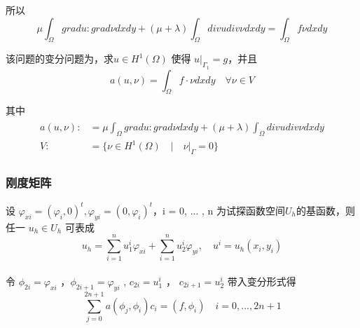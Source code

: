 \documentclass[a4paper,UTF8,titlepage]{ctexart}
\begin{document}
所以
$$
\mu \int_{\Omega} grad u : grad \nu dxdy + (\mu +\lambda) \int_{\Omega} div u div \nu  dxdy = \int_{\Omega} f \nu dxdy
$$

该问题的变分问题为，求$u \in H^1(\Omega)$ 使得 $u |_{\Gamma_1} = g$，并且
$$
	a(u,\nu) = \int_{\Omega} f \cdot \nu dxdy \quad \forall \nu \in V
$$ 
\par
其中
$$
	\begin{matrix}
		\begin{aligned}
			a(u,\nu) :&= \mu \int_{\Omega} grad u : grad \nu dxdy + (\mu +\lambda) \int_{\Omega} div u div \nu  dxdy \\  
			
			V :&= \{ \nu \in H^1(\Omega) \quad | \quad \nu |_{\Gamma} = 0 \}
		\end{aligned}
	\end{matrix}
$$



	
%
%	
%	

\subsubsection{刚度矩阵}

设 $\varphi_{xi} = (\varphi_i, 0)^t, \varphi_{yi} = (0,\varphi_i)^t$，i = 0, ... , n 为试探函数空间$U_h$的基函数，则任一 $u_h \in U_h$ 可表成
$$
	u_h = \sum\limits_{i=1}^n u^{i}_1 \varphi_{xi} + \sum\limits_{i=1}^n u^{i}_2 \varphi_{yi}, \quad u^i = u_h(x_i,y_i)
$$ 
\\ 
令 $\phi_{2i} = \varphi_{xi}$ ，$\phi_{2i+1} = \varphi_{yi}$ , $c_{2i} = u^i_1$ ， $c_{2i+1} = u^i_2$
带入变分形式得
$$
	\sum\limits_{j=0}^{2n+1} a(\phi_j, \phi_i) c_i = (f,\phi_i) \quad i=0, ... ,2n+1
$$
\end{document}
